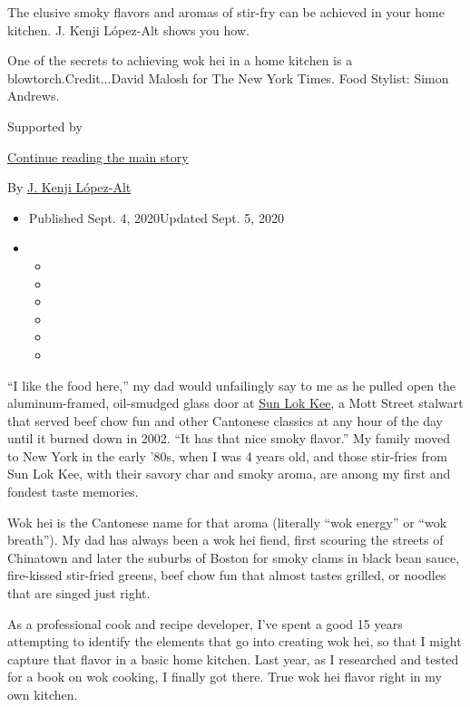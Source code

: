 The elusive smoky flavors and aromas of stir-fry can be achieved in your
home kitchen. J. Kenji López-Alt shows you how.

One of the secrets to achieving wok hei in a home kitchen is a
blowtorch.Credit...David Malosh for The New York Times. Food Stylist:
Simon Andrews.

Supported by

\protect\hyperlink{after-sponsor}{Continue reading the main story}

By \href{https://www.nytimes3xbfgragh.onion/by/j-kenji-lopez-alt}{J.
Kenji López-Alt}

\begin{itemize}
\item
  Published Sept. 4, 2020Updated Sept. 5, 2020
\item
  \begin{itemize}
  \item
  \item
  \item
  \item
  \item
  \item
  \end{itemize}
\end{itemize}

``I like the food here,'' my dad would unfailingly say to me as he
pulled open the aluminum-framed, oil-smudged glass door at
\href{https://www.nytimes3xbfgragh.onion/2002/10/09/dining/25-and-under-cantonese-old-timer-changes-boroughs-not-bean-sauce.html}{Sun
Lok Kee}, a Mott Street stalwart that served beef chow fun and other
Cantonese classics at any hour of the day until it burned down in 2002.
``It has that nice smoky flavor.'' My family moved to New York in the
early '80s, when I was 4 years old, and those stir-fries from Sun Lok
Kee, with their savory char and smoky aroma, are among my first and
fondest taste memories.

Wok hei is the Cantonese name for that aroma (literally ``wok energy''
or ``wok breath''). My dad has always been a wok hei fiend, first
scouring the streets of Chinatown and later the suburbs of Boston for
smoky clams in black bean sauce, fire-kissed stir-fried greens, beef
chow fun that almost tastes grilled, or noodles that are singed just
right.

As a professional cook and recipe developer, I've spent a good 15 years
attempting to identify the elements that go into creating wok hei, so
that I might capture that flavor in a basic home kitchen. Last year, as
I researched and tested for a book on wok cooking, I finally got there.
True wok hei flavor right in my own kitchen.

